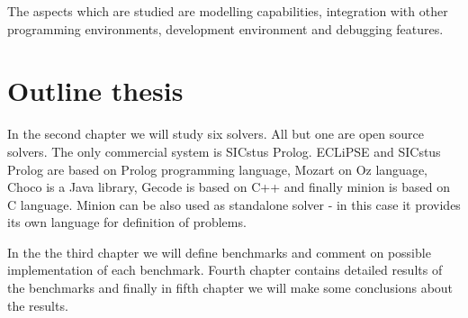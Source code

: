 The aspects which are studied are modelling capabilities, integration with other 
programming environments, development environment and debugging features. 

\section{Outline thesis}

In the second chapter we will study six solvers. All but one are open source solvers. 
The only commercial system is SICstus Prolog. ECLiPSE and SICstus Prolog are based on Prolog
programming language, Mozart on Oz language, Choco is a Java library, Gecode is based on C++ and finally 
minion is based on C language. Minion can be also used as standalone solver - in this 
case it provides its own language for definition of problems.

In the the third chapter we will define benchmarks and comment on possible 
implementation of each benchmark. Fourth chapter contains detailed results of 
the benchmarks and finally in fifth chapter we will make some conclusions about 
the results.
